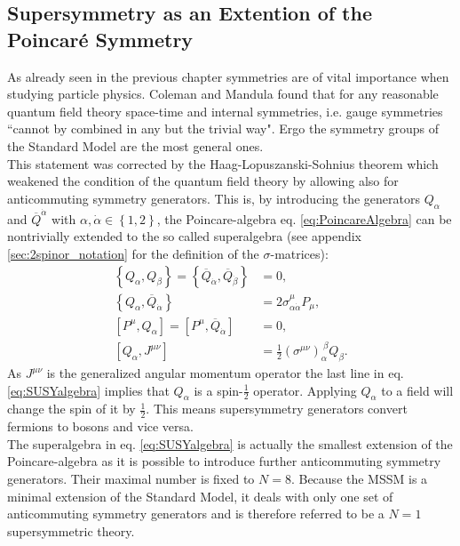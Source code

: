 \subsection{Supersymmetry as an Extention of the Poincaré Symmetry}\label{sec:SUSYalgebra}
As already seen in the previous chapter symmetries are of vital importance when studying particle physics. Coleman and Mandula \cite{Coleman:1967ad} found that for any reasonable quantum field theory space-time and internal symmetries, i.e. gauge symmetries ``cannot by combined in any but the trivial way"\cite{Pelc:1996vg}. Ergo the symmetry groups of the Standard Model are the most general ones.\\
This statement was corrected by the Haag-Lopuszanski-Sohnius theorem \cite{Haag:1974qh} which weakened the condition of the quantum field theory by allowing also for anticommuting symmetry generators. This is, by introducing the generators $Q_\alpha$ and $\overline{Q}^{\dot{\alpha}}$ with $\alpha, \dot{\alpha} \in \left\{ 1,2 \right\}$, the Poincare-algebra eq. \eqref{eq:PoincareAlgebra} can be nontrivially extended to the so called superalgebra (see appendix \eqref{sec:2spinor_notation} for the definition of the $\sigma$-matrices):
\begin{align}
\left\{Q_\alpha,Q_\beta\right\} = \left\{\overline{Q}_{\dot{\alpha}},\overline{Q}_{\dot{\beta}}\right\} &= 0,  \nonumber\\
\left\{Q_\alpha,\overline{Q}_{\dot{\alpha}}\right\} &= 2\sigma^\mu_{\alpha\dot{\alpha}} P_\mu, \nonumber\\
[P^\mu,Q_\alpha] = [P^\mu,\overline{Q}_{\dot{\alpha}}] &= 0, \nonumber \\
[Q_\alpha, J^{\mu\nu}] &= \frac{1}{2} (\sigma^{\mu\nu})_\alpha^{\ \beta} Q_\beta.\label{eq:SUSYalgebra}
\end{align}
As $J^{\mu\nu}$ is the generalized angular momentum operator the last line in eq. \eqref{eq:SUSYalgebra} implies that $Q_\alpha$ is a spin-$\frac{1}{2}$ operator. Applying $Q_\alpha$ to a field will change the spin of it by $\frac{1}{2}$. This means supersymmetry generators convert fermions to bosons and vice versa.\\
The superalgebra in eq. \eqref{eq:SUSYalgebra} is actually the smallest extension of the Poincare-algebra as it is possible to introduce further anticommuting symmetry generators. Their maximal number is fixed to $N = 8$. Because the MSSM is a minimal extension of the Standard Model, it deals with only one set of anticommuting symmetry generators and is therefore referred to be a $N = 1$ supersymmetric theory.\\
